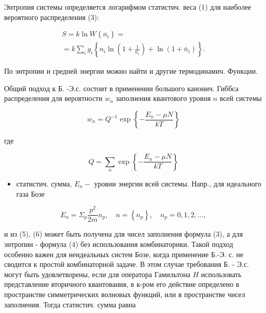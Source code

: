 \documentclass[10pt]{article}
\begin{document}
Энтропия системы определяется логарифмом статистич. веса (1) для наиболее вероятного распределения (3):



\[

\begin{gathered}

S=k \ln W\left\{\overline{n_{i}}\right\}= \\

=k \sum_{i} g_{i}\left\{n_{i} \ln \left(1+\frac{1}{\bar{n}_{i}}\right)+\ln \left(1+\bar{n}_{i}\right)\right\} .

\end{gathered}

\]



По энтропии и средней энергии можно найти и другие термодинамич. Функции.



Общий подход к Б. -Э.с. состоит в применении большого канонич. Гиббса распределения для вероятности $w_{n}$ заполнения квантового уровня $n$ всей системы



\[

w_{n}=Q^{-1} \exp \left\{-\frac{E_{n}-\mu N}{k T}\right\}

\]



где



\[

Q=\sum_{n} \exp \left\{-\frac{E_{n}-\mu N}{k T}\right\}

\]



\begin{itemize}

  \item статистич. сумма, $E_{n}-$ уровни энергии всей системы. Напр., для идеального газа Бозе

\end{itemize}



\[

E_{n}=\Sigma_{p} \frac{p^{2}}{2 m} n_{p}, \quad n=\left\{n_{p}\right\}, \quad n_{p}=0,1,2, \ldots,

\]



и из (5), (6) может быть получена для чисел заполнения формула (3), а для энтропии - формула (4) без использования комбинаторики. Такой подход особенно важен для неидеальных систем Бозе, когда применение Б.-Э. с. не сводится к простой комбинаторной задаче. В этом случае требования Б. - Э.с. могут быть удовлетворены, если для оператора Гамильтона $H$ использовать представление вторичного квантования, в к-ром его действие определено в пространстве симметрических волновых функций, или в пространстве чисел заполнения. Тогда статистич. сумма равна
\end{document}
